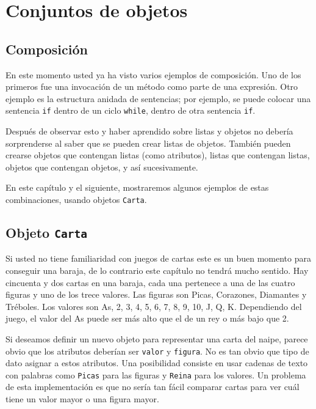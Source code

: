 
\chapter{Conjuntos de objetos}

\section{Composición}

 

En este momento usted ya ha visto varios ejemplos de composición.
Uno de los primeros fue una invocación de un método como parte de
una expresión. Otro ejemplo es la estructura anidada de sentencias;
por ejemplo, se puede colocar una sentencia \texttt{if} dentro de
un ciclo \texttt{while}, dentro de otra sentencia \texttt{if}.

Después de observar esto y haber aprendido sobre listas y objetos
no debería sorprenderse al saber que se pueden crear listas de objetos.
También pueden crearse objetos que contengan listas (como atributos),
listas que contengan listas, objetos que contengan objetos, y así
sucesivamente.

En este capítulo y el siguiente, mostraremos algunos ejemplos de estas
combinaciones, usando objetos \texttt{Carta}.

\section{Objeto \texttt{Carta} }

 

Si usted no tiene familiaridad con juegos de cartas este es un buen
momento para conseguir una baraja, de lo contrario este capítulo no
tendrá mucho sentido. Hay cincuenta y dos cartas en una baraja, cada
una pertenece a una de las cuatro figuras y uno de los trece valores.
Las figuras son Picas, Corazones, Diamantes y Tréboles. Los valores
son As, 2, 3, 4, 5, 6, 7, 8, 9, 10, J, Q, K. Dependiendo del juego,
el valor del As puede ser más alto que el de un rey o más bajo que
2.

 

Si deseamos definir un nuevo objeto para representar una carta del
naipe, parece obvio que los atributos deberían ser \texttt{valor}
y \texttt{figura}. No es tan obvio que tipo de dato asignar a estos
atributos. Una posibilidad consiste en usar cadenas de texto con palabras
como \texttt{Picas} para las figuras y \texttt{Reina} para los valores.
Un problema de esta implementación es que no sería tan fácil comparar
cartas para ver cuál tiene un valor mayor o una figura mayor.

